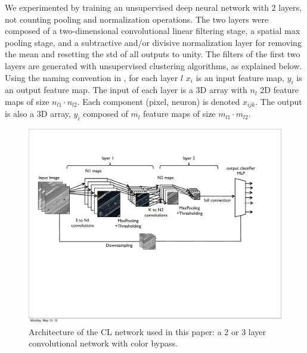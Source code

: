 \documentclass{article} %
\begin{document}
We experimented by training an unsupervised deep neural network with 2 layers, not counting pooling and normalization operations. The two layers were composed of a two-dimensional convolutional linear filtering stage, a spatial max pooling stage, and a subtractive and/or divisive normalization layer for removing the mean and resetting the std of all outputs to unity. 
The filters of the first two layers are generated with unsupervised clustering algorithms, as explained below. 
Using the naming convention in \cite{lecun_convolutional_2010}, for each layer $l$  $x_i$ is an input feature map, $y_i$ is an output feature map. The input of each layer is a 3D array with $n_l$ 2D feature maps of size $n_{l1} \cdot n_{l2}$. Each component (pixel, neuron) is denoted $x_{ijk}$. The output is also a 3D array, $y_i$ composed of $m_l$ feature maps of size $m_{l1} \cdot m_{l2}$.


\begin{figure}
\includegraphics[width=5in]{fig-netarch.pdf}
\caption{Architecture of the CL network used in this paper: a 2 or 3 layer convolutional network with color bypass.}
\label{fig-netarch}
\end{figure}
\end{document}
